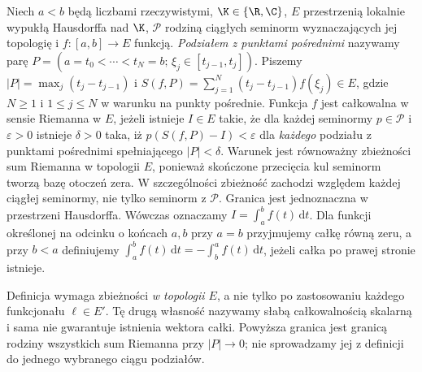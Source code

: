 \begin{definicja}
\label{def:riemann-lcs15a}
Niech $a<b$ będą liczbami rzeczywistymi, $\K\in\{\R,\C\}$,
$E$ przestrzenią lokalnie wypukłą Hausdorffa nad $\K$,
$\mathcal P$ rodziną ciągłych seminorm wyznaczających jej
topologię i $f:[a,b]\to E$ funkcją. \emph{Podziałem z punktami pośrednimi} nazywamy
parę $P=(a=t_0<\cdots<t_N=b;\,\xi_j\in[t_{j-1},t_j])$.
Piszemy $|P|=\max_j(t_j-t_{j-1})$ i
$S(f,P)=\sum_{j=1}^N(t_j-t_{j-1})f(\xi_j)\in E$,
gdzie $N\ge1$ i $1\le j\le N$ w warunku na punkty pośrednie.
Funkcja $f$ jest całkowalna w sensie Riemanna w $E$, jeżeli istnieje $I\in E$
takie, że dla każdej seminormy $p\in\mathcal P$ i $\varepsilon>0$ istnieje
$\delta>0$ taka, iż $p(S(f,P)-I)<\varepsilon$ dla \emph{każdego} podziału
z punktami pośrednimi spełniającego $|P|<\delta$.
Warunek jest równoważny zbieżności sum Riemanna
w topologii $E$, ponieważ skończone przecięcia kul seminorm
tworzą bazę otoczeń zera. W szczególności zbieżność zachodzi
względem każdej ciągłej seminormy, nie tylko seminorm z $\mathcal P$.
Granica jest jednoznaczna w przestrzeni Hausdorffa.
Wówczas oznaczamy $I=\int_a^b f(t)\,\mathrm dt$.
Dla funkcji określonej na odcinku o końcach $a,b$ przy
$a=b$ przyjmujemy całkę równą zeru, a przy $b<a$ definiujemy
$\int_a^b f(t)\,\mathrm dt=-\int_b^a f(t)\,\mathrm dt$,
jeżeli całka po prawej stronie istnieje.
\end{definicja}

\begin{uwaga}
Definicja wymaga zbieżności \emph{w topologii $E$}, a nie tylko po
zastosowaniu każdego funkcjonału $\ell\in E'$. Tę drugą własność nazywamy
słabą całkowalnością skalarną i sama nie gwarantuje istnienia wektora całki.
Powyższa granica jest granicą rodziny wszystkich sum Riemanna przy
$|P|\to0$; nie sprowadzamy jej z definicji do jednego wybranego ciągu podziałów.
\end{uwaga}

